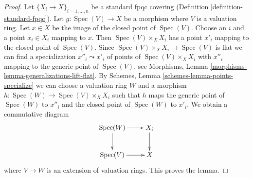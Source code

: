\documentclass[10pt,a4paper]{amsart}
\theoremstyle{plain}
\theoremstyle{definition}
\theoremstyle{remark}
\numberwithin{equation}{subsection}
\def\Spec{\mathop{\mathrm{Spec}}}
\begin{document}
\begin{proof}
Let $\{X_i \to X\}_{i = 1, \ldots, n}$ be a standard fpqc covering
(Definition \ref{definition-standard-fpqc}). Let $g : \Spec(V) \to X$
be a morphism where $V$ is a valuation ring. Let $x \in X$ be the
image of the closed point of $\Spec(V)$. Choose an $i$ and a point
$x_i \in X_i$ mapping to $x$. Then $\Spec(V) \times_X X_i$
has a point $x'_i$ mapping to the closed point of $\Spec(V)$.
Since $\Spec(V) \times_X X_i \to \Spec(V)$ is flat
we can find a specialization $x''_i \leadsto x'_i$ of
points of $\Spec(V) \times_X X_i$ with $x''_i$ mapping to
the generic point of $\Spec(V)$, see
Morphisms, Lemma \ref{morphisms-lemma-generalizations-lift-flat}. By
Schemes, Lemma \ref{schemes-lemma-points-specialize}
we can choose a valuation ring $W$ and a morphism
$h : \Spec(W) \to \Spec(V) \times_X X_i$ such that $h$
maps the generic point of $\Spec(W)$ to $x''_i$ and the
closed point of $\Spec(W)$ to $x'_i$. We obtain a
commutative diagram
$$
\xymatrix{
\Spec(W) \ar[r] \ar[d] & X_i \ar[d] \\
\Spec(V) \ar[r] & X
}
$$
where $V \to W$ is an extension of valuation rings.
This proves the lemma.
\end{proof}
\end{document}
